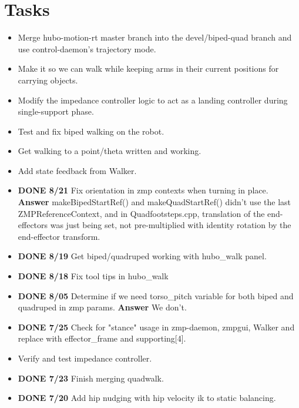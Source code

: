\documentclass[letterpaper, 10 pt]{report}
\begin{document}
\section*{Tasks}
\begin{itemize}
\item Merge hubo-motion-rt master branch into the devel/biped-quad branch and use control-daemon's trajectory mode.
\item Make it so we can walk while keeping arms in their current positions for carrying objects.
\item Modify the impedance controller logic to act as a landing controller during single-support phase.
\item Test and fix biped walking on the robot.
\item Get walking to a point/theta written and working.
\item Add state feedback from Walker.
\item \textbf{DONE 8/21} Fix orientation in zmp contexts when turning in place. \newline
\textbf{Answer} makeBipedStartRef() and makeQuadStartRef() didn't use the last ZMPReferenceContext, and in Quadfootsteps.cpp, translation of the end-effectors was just being set, not pre-multiplied with identity rotation by the end-effector transform.
\item \textbf{DONE 8/19} Get biped/quadruped working with hubo\_walk panel.
\item \textbf{DONE 8/18} Fix tool tips in hubo\_walk
\item \textbf{DONE 8/05} Determine if we need torso\_pitch variable for both biped and quadruped in zmp params. \textbf{Answer} We don't.
\item \textbf{DONE 7/25} Check for "stance" usage in zmp-daemon, zmpgui, Walker and replace with effector\_frame and supporting[4].
\item Verify and test impedance controller.
\item \textbf{DONE 7/23} Finish merging quadwalk.
\item \textbf{DONE 7/20} Add hip nudging with hip velocity ik to static balancing.
\end{itemize}
\end{document}
